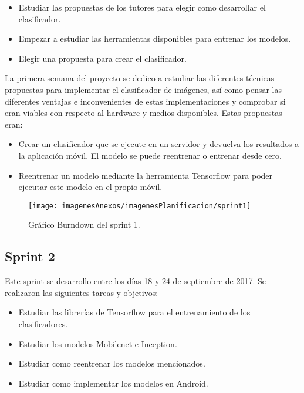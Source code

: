 \begin{itemize}
	\item Estudiar las propuestas de los tutores para elegir como desarrollar el clasificador.
	\item Empezar a estudiar las herramientas disponibles para entrenar los modelos.
	\item Elegir una propuesta para crear el clasificador.
\end{itemize}

La primera semana del proyecto se dedico a estudiar las diferentes técnicas propuestas para implementar el clasificador de imágenes, así como pensar las diferentes ventajas e inconvenientes de estas implementaciones y comprobar si eran viables con respecto al hardware y medios disponibles. Estas propuestas eran:
\begin{itemize}
	\item Crear un clasificador que se ejecute en un servidor y devuelva los resultados a la aplicación móvil. El modelo se puede reentrenar o entrenar desde cero.
	\item Reentrenar un modelo mediante la herramienta Tensorflow para poder ejecutar este modelo en el propio móvil.
\end{itemize}

\begin{figure}[h]
    \begin{center}%
        \begin{center}%
          \texttt{[image: imagenesAnexos/imagenesPlanificacion/sprint1]}%
          \caption{Gráfico Burndown del sprint 1.}%
          \label{figSprint1}%
        \end{center}%
  	\end{center}%
\end{figure}%
\newpage

\subsection{Sprint 2}

Este sprint se desarrollo entre los días 18 y 24 de septiembre de 2017. Se realizaron las siguientes tareas y objetivos:

\begin{itemize}
	\item Estudiar las librerías de Tensorflow para el entrenamiento de los clasificadores.
	\item Estudiar los modelos Mobilenet e Inception.
	\item Estudiar como reentrenar los modelos mencionados.
	\item Estudiar como implementar los modelos en Android.
\end{itemize}

